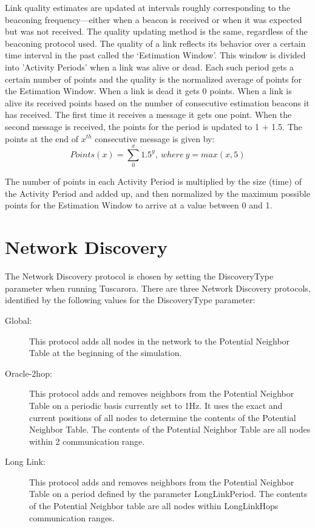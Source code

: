 Link quality estimates are updated at intervals roughly corresponding
to the beaconing frequency---either when a beacon is received or when
it was expected but was not received. The quality updating
method is the same, regardless of the beaconing protocol used. The
quality of a link reflects its behavior over a certain time interval in the
past called the `Estimation Window'. This window is divided into
'Activity Periods' when a link was alive or dead. Each such period
gets a certain number of points and the quality is the normalized average
of points for the Estimation Window. When a link is dead it gets 0
points. When a link is alive its received points based on the number of
consecutive estimation beacons it has received. The first time it
receives a message it gets one point. When the second message is
received, the points for the period is updated to 1 + 1.5. The points
at the end of $x^{th}$ consecutive message is given by:\\ 

\begin{equation}
Points (x) = \sum_{0}^{x} 1.5^y,\ where\ y = max(x,5)
\end{equation}

The number of points in each Activity Period is multiplied by the size
(time) of the Activity Period and added up, and then normalized by the
maximum possible points for the Estimation Window to arrive at a value
between 0 and 1.

\section{Network Discovery}
The Network Discovery protocol is chosen by setting the DiscoveryType
parameter when running Tuscarora. There are three Network Discovery
protocols, identified by the following values for the DiscoveryType parameter: 
\begin{description}
\item[Global:] This protocol adds all nodes in the network to the
  Potential Neighbor Table at the beginning of the simulation.
\item[Oracle-2hop:] This protocol adds and removes neighbors from the
  Potential Neighbor Table on a periodic basis currently set to
  1Hz. It uses the exact and current positions of all nodes to
  determine the contents of the Potential Neighbor Table. The contents
  of the Potential Neighbor Table are all nodes within 2 communication
  range. 
\item[Long Link:] This protocol adds and removes neighbors from the
  Potential Neighbor Table on a period defined by the parameter
  LongLinkPeriod. The contents of the Potential Neighbor table are all
  nodes within LongLinkHops communication ranges. 
\end{description}


